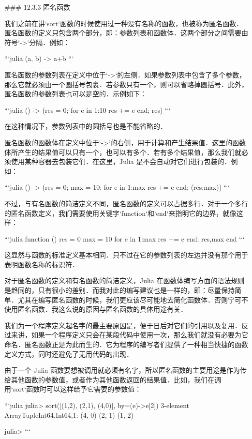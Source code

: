 ### 12.3.3 匿名函数

我们之前在讲`sort`函数的时候使用过一种没有名称的函数，也被称为匿名函数．匿名函数的定义只包含两个部分，即：参数列表和函数体．这两个部分之间需要由符号`->`分隔．例如：

```julia
(a, b) -> a+b
```

匿名函数的参数列表在定义中位于`->`的左侧．如果参数列表中包含了多个参数，那么它就必须由一个圆括号包裹．若参数只有一个，则可以省略掉圆括号．此外，匿名函数的参数列表也可以是空的．示例如下：

```julia
() -> (res = 0; for e in 1:10 res += e end; res)
```

在这种情况下，参数列表中的圆括号也是不能省略的．

匿名函数的函数体在定义中位于`->`的右侧，用于计算和产生结果值．这里的函数体所产生的结果值可以只有一个，也可以有多个．若有多个结果值，那么我们就必须使用某种容器去包装它们．在这里，Julia 是不会自动对它们进行包装的．例如：

```julia
() -> (res = 0; max = 10; for e in 1:max res += e end; (res,max))
```

不过，与有名函数的简洁定义不同，匿名函数的定义可以占据多行．对于一个多行的匿名函数定义，我们需要使用关键字`function`‌和`end`来指明它的边界，就像这样：

```julia
function ()
    res = 0
    max = 10
    for e in 1:max res += e end;
    res,max
end
```

这显然与函数的标准定义基本相同．只不过在它的参数列表的左边并没有那个用于表明函数名称的标识符．

对于匿名函数的定义和有名函数的简洁定义，Julia 在函数体编写方面的语法规则是趋同的，只有很小的差别．而我对此的编写建议也是一样的，即：尽量保持简单．尤其在编写匿名函数的时候，我们更应该尽可能地去简化函数体．否则宁可不使用匿名函数．我这么说的原因与匿名函数的具体用途有关．

我们为一个程序定义起名字的最主要原因是，便于日后对它们的引用以及复用．反过来讲，如果一个程序定义只会在某段代码中使用一次，那么我们就没有必要为它命名．匿名函数正是为此而生的．它为程序的编写者们提供了一种相当快捷的函数定义方式，同时还避免了无用代码的出现．

由于一个 Julia 函数要想被调用就必须有名字，所以匿名函数的主要用途是作为传给其他函数的参数值，或者作为其他函数返回的结果值．比如，我们在调用`sort`函数时可以这样给予它需要的参数值：

```julia
julia> sort([(1,2), (2,1), (4,0)], by=(e)->e[2])
3-element Array{Tuple{Int64,Int64},1}:
 (4, 0)
 (2, 1)
 (1, 2)

julia> 
```

